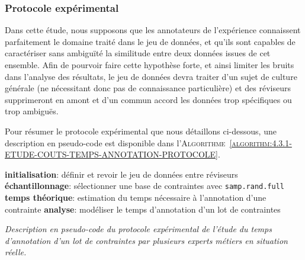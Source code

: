 		\subsubsection{Protocole expérimental}
			
			\begin{leftBarWarning}
				Dans cette étude, nous supposons que les annotateurs de l'expérience connaissent parfaitement le domaine traité dans le jeu de données, et qu'ils sont capables de caractériser sans ambiguïté la similitude entre deux données issues de cet ensemble.
				Afin de pourvoir faire cette hypothèse forte, et ainsi limiter les bruits dans l'analyse des résultats, le jeu de données devra traiter d'un sujet de culture générale (ne nécessitant donc pas de connaissance particulière) et des réviseurs supprimeront en amont et d'un commun accord les données trop spécifiques ou trop ambiguës.
			\end{leftBarWarning}
			
			Pour résumer le protocole expérimental que nous détaillons ci-dessous, une description en pseudo-code est disponible dans l'\textsc{Algorithme~\ref{algorithm:4.3.1-ETUDE-COUTS-TEMPS-ANNOTATION-PROTOCOLE}}.

			\begin{algorithm}
				\textbf{initialisation}: définir et revoir le jeu de données entre réviseurs \;
				\textbf{échantillonnage}: sélectionner une base de contraintes avec \texttt{samp.rand.full} \;
				\textbf{temps théorique}: estimation du temps nécessaire à l'annotation d'une contrainte \;
				\textbf{analyse}: modéliser le temps d'annotation d'un lot de contraintes \;
				\caption{\textit{
					Description en pseudo-code du protocole expérimental de l'étude du temps d'annotation d'un lot de contraintes par plusieurs experts métiers en situation réelle.
				}}
				\label{algorithm:4.3.1-ETUDE-COUTS-TEMPS-ANNOTATION-PROTOCOLE}
			\end{algorithm}
			

